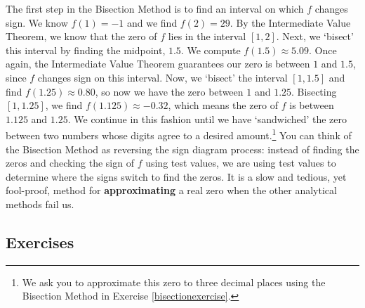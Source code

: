 \label{bisectionmethod}

The first step in the Bisection Method is to find an interval on which $f$ changes sign.  We know $f(1) = -1$ and we find $f(2) = 29$.  By the Intermediate Value Theorem, we know that the zero of $f$ lies in the interval $[1,2]$.  Next, we `bisect' this interval by finding the midpoint,  $1.5$.  We compute  $f(1.5)\approx 5.09$.  Once again, the Intermediate Value Theorem guarantees our zero is between $1$ and $1.5$, since $f$ changes sign on this interval.  Now, we `bisect' the interval $[1,1.5]$ and find $f(1.25) \approx 0.80$, so now we have the zero between $1$ and $1.25$.  Bisecting $[1,1.25]$, we find $f(1.125) \approx -0.32$, which means the zero of $f$ is between $1.125$ and $1.25$.  We continue in this fashion until we have `sandwiched' the zero between two numbers whose digits agree to a desired amount.\footnote{We ask you to approximate this zero to three decimal places using the Bisection Method  in Exercise \ref{bisectionexercise}.} You can think of the Bisection Method as reversing the sign diagram process:  instead of finding the zeros and checking the sign of $f$ using test values, we are using test values to determine where the signs switch to find the zeros.  It is a slow and tedious, yet fool-proof, method for \textbf{approximating} a real zero when the other analytical methods fail us.  


\newpage

\subsection{Exercises}



\closegraphsfile